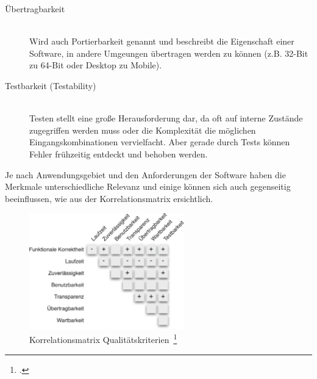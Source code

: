 \begin{description}
\begin{description}
    \item[Übertragbarkeit] \hfill \\ Wird auch Portierbarkeit genannt und beschreibt die Eigenschaft einer Software, in andere Umgeungen übertragen werden zu können (z.B. 32-Bit zu 64-Bit oder Desktop zu Mobile).
    \item[Testbarkeit (Testability)] \hfill \\ Testen stellt eine große Herausforderung dar, da oft auf interne Zustände zugegriffen werden muss oder die Komplexität die möglichen Eingangskombinationen vervielfacht. Aber gerade durch Tests können Fehler frühzeitig entdeckt und behoben werden.
  \end{description}
\end{description}

Je nach Anwendungsgebiet und den Anforderungen der Software haben die Merkmale unterschiedliche Relevanz und einige können sich auch gegenseitig beeinflussen, wie aus der Korrelationsmatrix ersichtlich.

\begin{savenotes}
  \begin{figure}[H] 
    \centering
       \includegraphics[width=0.6\textwidth]{img/korrelationsmatrix-kriterien.png}
    \caption[Korrelationsmatrix Qualitätskriterien]{Korrelationsmatrix Qualitätskriterien~\footcite[][S. 11, Abb. 1.3]{hoffmann_software-qualitat_2013}}
    \label{fig:JSEP Architektur}
  \end{figure}
\end{savenotes}
